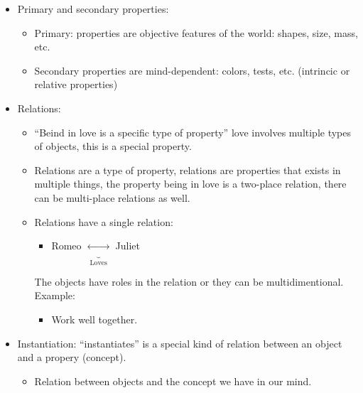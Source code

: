 \begin{itemize}
    \item Primary and secondary properties: 
        \begin{itemize}
            \item Primary: properties are objective features of the world: shapes, size, mass, etc. 
            \item Secondary properties are mind-dependent: colors, tests, etc. (intrincic or relative properties)
        \end{itemize}
    
    \item Relations: 
        \begin{itemize}
            \item ``Beind in love is a specific type of property'' love involves multiple types of objects, this is a special property.
            \item Relations are a type of property, relations are properties that exists in multiple things, the property being in love is a two-place relation, there can be multi-place relations as well.
            \item Relations have a single relation: 
                \begin{itemize}
                    \item Romeo $\underbrace{\leftrightarrow }_{\text{ Loves }}$ Juliet
                \end{itemize}
                The objects have roles in the relation or they can be multidimentional.
                \newline Example: 
                \begin{itemize}
                    \item Work well together.
                \end{itemize}
        \end{itemize}
    
    \item Instantiation: ``instantiates'' is a special kind of relation between an object and a propery (concept). 
        \begin{itemize}
            \item Relation between objects and the concept we have in our mind. 
        \end{itemize}
\end{itemize}



